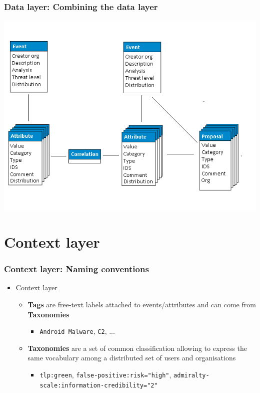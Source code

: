 \begin{frame}
    \frametitle{Data layer: Combining the data layer}
    \begin{center}
        \includegraphics[width=0.90\linewidth]{screenshots/datamodel4.png}
    \end{center}
\end{frame}

\section{Context layer}
\begin{frame}
    \frametitle{Context layer: Naming conventions}
     \begin{itemize}
            \item Context layer
            \begin{itemize}
                \item {\bf Tags} are free-text labels attached to events/attributes and can come from {\bf Taxonomies}
                \begin{itemize}
                    \item \texttt{Android Malware}, \texttt{C2}, ...
                \end{itemize}

                \item {\bf Taxonomies} are a set of common classification allowing to express the same vocabulary among a distributed set of users and organisations 
                \begin{itemize}
                    \item \texttt{tlp:green}, \texttt{false-positive:risk="high"}, \texttt{admiralty-scale:information-credibility="2"}
                \end{itemize}
            \end{itemize}
    \end{itemize}
\end{frame}

